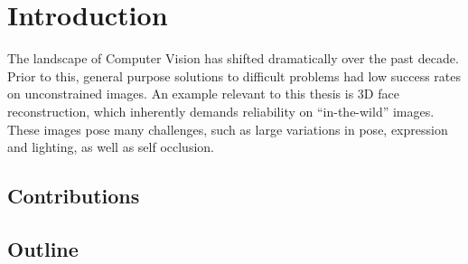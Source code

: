 \chapter{Introduction}

The landscape of Computer Vision has shifted dramatically over the
past decade. Prior to this, general purpose solutions to difficult
problems had low success rates on unconstrained images. An example
relevant to this thesis is 3D face reconstruction, which inherently
demands reliability on ``in-the-wild'' images. These images pose many
challenges, such as large variations in pose, expression and lighting,
as well as self occlusion.

\section{Contributions}



\section{Outline}








